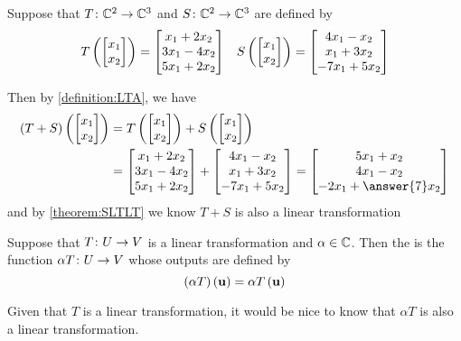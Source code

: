 \documentclass{ximera}
\begin{document}
\begin{example}

Suppose that $T\colon \mathbb{C}^{2}\rightarrow\mathbb{C}^{3}$ and $S\colon \mathbb{C}^{2}\rightarrow\mathbb{C}^{3}$ are defined by
\begin{align*}
T\left(\begin{bmatrix}x_1\\x_2\end{bmatrix}\right)=\begin{bmatrix}x_1+2x_2\\3x_1-4x_2\\5x_1+2x_2\end{bmatrix}
&&
S\left(\begin{bmatrix}x_1\\x_2\end{bmatrix}\right)=\begin{bmatrix}4x_1-x_2\\x_1+3x_2\\-7x_1+5x_2\end{bmatrix}
\end{align*}

Then by \ref{definition:LTA}, we have
\begin{align*}
\lteval{(T+S)}{\colvector{x_1\\x_2}}&=\lteval{T}{\colvector{x_1\\x_2}}+\lteval{S}{\colvector{x_1\\x_2}}\\
&=\colvector{x_1+2x_2\\3x_1-4x_2\\5x_1+2x_2}+\colvector{4x_1-x_2\\x_1+3x_2\\-7x_1+5x_2}
=\colvector{5x_1+x_2\\4x_1-x_2\\-2x_1+\answer{7}x_2}
\end{align*}
and by \ref{theorem:SLTLT} we know $T+S$ is also a linear transformation 
\begin{multipleChoice}
\end{multipleChoice}
\end{example}

\begin{definition}
Suppose that $T\colon U\rightarrow V$ is a linear transformation and $\alpha\in\mathbb{C}$.  Then the  is the function $\alpha T\colon U\rightarrow V$ whose outputs are defined by
\[
(\alpha T)\left(\mathbf{u}\right)=\alpha T\left(\mathbf{u}\right)
\]

\end{definition}

Given that $T$ is a linear transformation, it would be nice to know that $\alpha T$ is also a linear transformation.
\end{document}
